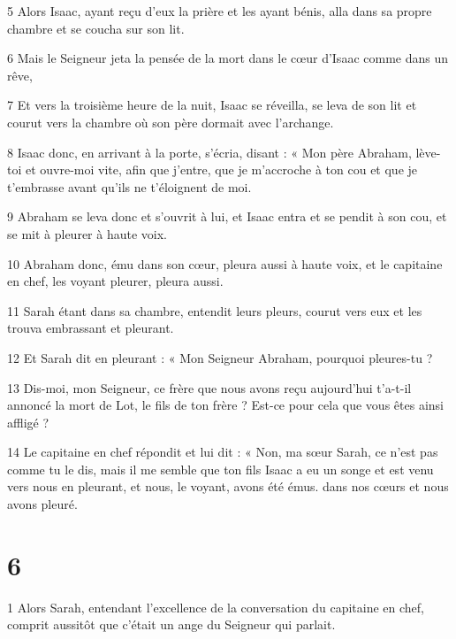 \par 5 Alors Isaac, ayant reçu d'eux la prière et les ayant bénis, alla dans sa propre chambre et se coucha sur son lit.

\par 6 Mais le Seigneur jeta la pensée de la mort dans le cœur d'Isaac comme dans un rêve,

\par 7 Et vers la troisième heure de la nuit, Isaac se réveilla, se leva de son lit et courut vers la chambre où son père dormait avec l'archange.

\par 8 Isaac donc, en arrivant à la porte, s'écria, disant : « Mon père Abraham, lève-toi et ouvre-moi vite, afin que j'entre, que je m'accroche à ton cou et que je t'embrasse avant qu'ils ne t'éloignent de moi.

\par 9 Abraham se leva donc et s'ouvrit à lui, et Isaac entra et se pendit à son cou, et se mit à pleurer à haute voix.

\par 10 Abraham donc, ému dans son cœur, pleura aussi à haute voix, et le capitaine en chef, les voyant pleurer, pleura aussi.

\par 11 Sarah étant dans sa chambre, entendit leurs pleurs, courut vers eux et les trouva embrassant et pleurant.

\par 12 Et Sarah dit en pleurant : « Mon Seigneur Abraham, pourquoi pleures-tu ?

\par 13 Dis-moi, mon Seigneur, ce frère que nous avons reçu aujourd'hui t'a-t-il annoncé la mort de Lot, le fils de ton frère ? Est-ce pour cela que vous êtes ainsi affligé ?

\par 14 Le capitaine en chef répondit et lui dit : « Non, ma sœur Sarah, ce n'est pas comme tu le dis, mais il me semble que ton fils Isaac a eu un songe et est venu vers nous en pleurant, et nous, le voyant, avons été émus. dans nos cœurs et nous avons pleuré.

\chapter{6}

\par 1 Alors Sarah, entendant l'excellence de la conversation du capitaine en chef, comprit aussitôt que c'était un ange du Seigneur qui parlait.

